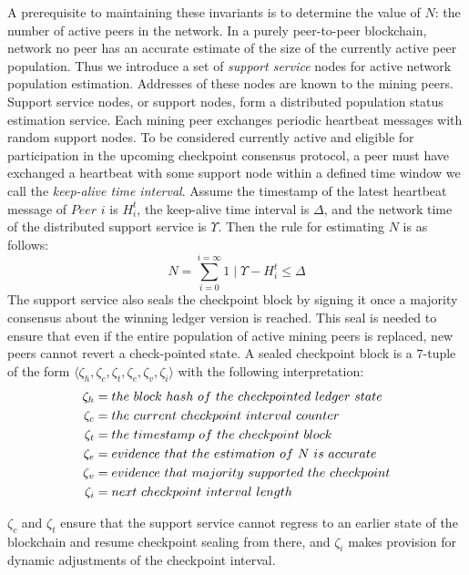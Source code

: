 A prerequisite to maintaining these invariants is to determine the value of $N$: the number of active peers in the network. In a purely peer-to-peer blockchain, network no peer has an accurate estimate of the size of the currently active peer population. Thus we introduce a set of \textit{support service} nodes for active network population estimation. Addresses of these nodes are known to the mining peers. Support service nodes, or support nodes, form a distributed population status estimation service. Each mining peer exchanges periodic heartbeat messages with random support nodes. To be considered currently active and eligible for participation in the upcoming checkpoint consensus protocol, a peer must have exchanged a heartbeat with some support node within a defined time window we call the \textit{keep-alive time interval}. Assume the timestamp of the latest heartbeat message of $Peer$ $i$ is $H_i^t$, the keep-alive time interval is $\Delta$, and the network time of the distributed support service is $\Upsilon$. Then the rule for estimating $N$ is as follows:  
\begin{equation}
\label{e-4}
N = \sum_{i = 0}^{i = \infty}{1 \mid \Upsilon - H_i^t \leq \Delta}
\end{equation}
The support service also seals the checkpoint block by signing it once a majority consensus about the winning ledger version is reached. This seal is needed to ensure that even if the entire population of active mining peers is replaced, new peers cannot revert a check-pointed state. A sealed checkpoint block is a $7$-tuple of the form $\langle \zeta_h, \zeta_c, \zeta_t, \zeta_e, \zeta_v, \zeta_i \rangle$ with the following interpretation:
\begin{equation*}
\begin{split}
	\zeta_h & = the\ block\ hash\ of\ the\ check\-pointed\ ledger\ state \\
	\zeta_c & = the\ current\ checkpoint\ interval\ counter \\
	\zeta_t & = the\ timestamp\ of\ the\ checkpoint\ block \\
	\zeta_e & = evidence\ that\ the\ estimation\ of\ N\ is\ accurate \\
	\zeta_v & = evidence\ that\ majority\ supported\ the\ checkpoint \\
	\zeta_i & = next\ checkpoint\ interval\ length
\end{split}
\end{equation*}

$\zeta_c$ and $\zeta_t$ ensure that the support service cannot regress to an earlier state of the blockchain and resume checkpoint sealing from there, and $\zeta_i$ makes provision for dynamic adjustments of the checkpoint interval.

